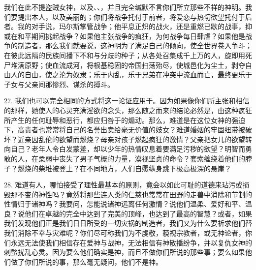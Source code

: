 我们在此不提盗贼女神，以及、、，并且完全缄默不言你们所立那些不祥的神明。我们要提出本人，以及美丽的；你们将战争托付于前者，将爱恋与热切欲望托付于后者。我的对手说，玛尔斯掌管战争；他平息正炽的战火，还是重燃已歇的战事，抑或在和平期间挑起战争？如果他主张战争的疯狂，为何战争每日肆虐？如果他是战争的制造者，那么我们就要说，这神明为了满足自己的倾向，使全世界卷入争斗；在彼此远隔的民族间播下不和与分歧的种子；从各处召集成千上万的人，旋即用死尸堆满原野；使血流成河，将根基稳固的帝国扫荡殆尽，使城邑化为尘土，剥夺自由人的自由，使之沦为奴隶；乐于内乱，乐于兄弟在冲突中流血而亡，最终更乐于子女与父亲间那惨烈、谋杀的搏斗。\par

27. 我们也可以完全相同的方式将这一论证应用于。因为如果像你们所主张和相信的那样，她使人的心灵充满淫欲的念头，那么随之而来的结论必然是，由这种疯狂所产生的任何耻辱和恶行，都应归咎于的煽动。那么，难道是在这位女神的强迫下，高贵者也常常将自己的名誉出卖给毫无价值的妓女？难道婚姻的牢固纽带被破坏？近亲因乱伦的欲望而燃烧？母亲对孩子燃起疯狂的激情？父亲把女儿的欲望转向自己？老年人令白发蒙羞，却以少年的热情叹息着要满足污秽的欲望？明智而勇敢的人，在柔弱中丧失了男子气概的力量，漠视坚贞的命令？套索缠绕着他们的脖子？燃烧的柴堆被登上？在不同地方，人们自愿纵身跳下极高极深的悬崖？\par

28. 难道有人，哪怕接受了理性最基本的原则，竟会以如此可耻的道德来玷污或损毁那不变的神性吗？竟然将那些连人类的仁慈也常常在田野的走兽中消除和节制的性情归于诸神吗？我要问，怎能说诸神远离任何激情？说他们温柔、爱好和平、温良？说他们在卓越的完全中达到了完美的顶峰，也达到了最高的智慧？或者，如果我们发现他们正是我们日日所受的一切灾祸的制造者，我们又为什么要祈求他们替我们消除不幸与灾难呢？你们尽可称我们为不虔敬，藐视宗教者，或无神论者，你们永远无法使我们相信存在爱神与战神，无法相信有神散播纷争，并以复仇女神的刺螫扰乱心灵。因为要么他们确实是神，而且不做你们所说的那些事；要么如果他们做了你们所说的事，那么毫无疑问，他们不是神。\par

